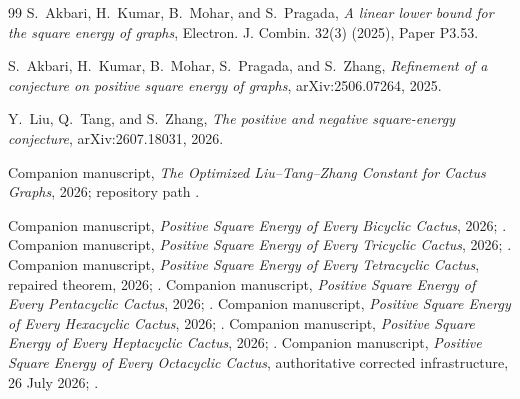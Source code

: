 \documentclass[11pt]{article}
\begin{document}
\begin{thebibliography}{99}
 S.~Akbari, H.~Kumar, B.~Mohar, and S.~Pragada,
\emph{A linear lower bound for the square energy of graphs}, Electron. J.
Combin. 32(3) (2025), Paper P3.53.

 S.~Akbari, H.~Kumar, B.~Mohar, S.~Pragada, and S.~Zhang,
\emph{Refinement of a conjecture on positive square energy of graphs},
arXiv:2506.07264, 2025.

 Y.~Liu, Q.~Tang, and S.~Zhang,
\emph{The positive and negative square-energy conjecture}, arXiv:2607.18031,
2026.

 Companion manuscript, \emph{The Optimized Liu--Tang--Zhang
Constant for Cactus Graphs}, 2026; repository path
.

 Companion manuscript, \emph{Positive Square Energy of Every
Bicyclic Cactus}, 2026; .
 Companion manuscript, \emph{Positive Square Energy of Every
Tricyclic Cactus}, 2026; .
 Companion manuscript, \emph{Positive Square Energy of
Every Tetracyclic Cactus}, repaired theorem, 2026;
.
 Companion manuscript, \emph{Positive Square Energy of
Every Pentacyclic Cactus}, 2026; .
 Companion manuscript, \emph{Positive Square Energy of
Every Hexacyclic Cactus}, 2026; .
 Companion manuscript, \emph{Positive Square Energy of
Every Heptacyclic Cactus}, 2026; .
 Companion manuscript, \emph{Positive Square Energy of
Every Octacyclic Cactus}, authoritative corrected infrastructure, 26 July 2026;
.


\end{thebibliography}
\end{document}
